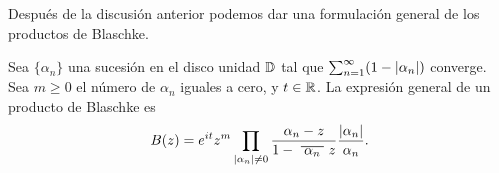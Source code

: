 Después de la discusión anterior podemos dar una formulación general de los productos de Blaschke. \\

\begin{corollary}
    Sea $\{\alpha_n\}$ una sucesión en el disco unidad $\mathbb{D}$ tal que $\sum_{n=1}^{\infty} (1 - \left\lvert\alpha_n\right\rvert)$ converge. Sea $m \geq 0$ el número de $\alpha_n$ iguales a cero, y $t \in \mathbb{R}$. La expresión general de un producto de Blaschke es
    \begin{equation*}
        B(z) = e^{it}z^m \prod_{\abs{\alpha_n} \not = 0} \frac{\alpha_n - z}{1 - \xbar{\alpha_n}z} \dfrac{\abs{\alpha_n}}{\alpha_n}.
    \end{equation*}
\end{corollary}
